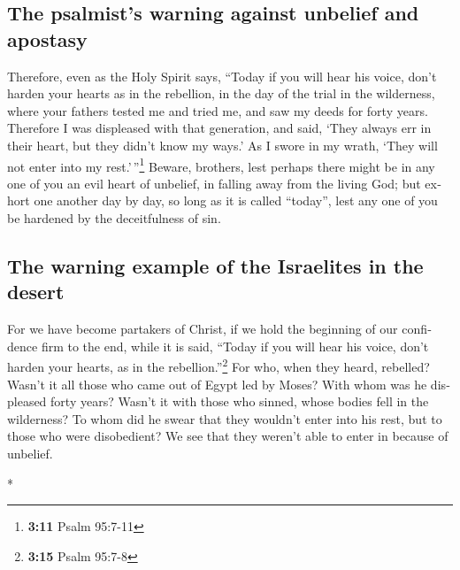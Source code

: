 \begin{paracol}{2}
\begin{otherlanguage}{english}
\hypertarget{the-psalmists-warning-against-unbelief-and-apostasy}{%
\subsection{The psalmist's warning against unbelief and
apostasy}\label{the-psalmists-warning-against-unbelief-and-apostasy}}

 Therefore, even as the Holy Spirit says, ``Today if you
will hear his voice,  don't harden your hearts as in the
rebellion, in the day of the trial in the wilderness, 
where your fathers tested me and tried me, and saw my deeds for forty
years.  Therefore I was displeased with that generation,
and said, `They always err in their heart, but they didn't know my
ways.'  As I swore in my wrath, `They will not enter into
my rest.'\,''\footnote{\textbf{3:11} Psalm 95:7-11} 
Beware, brothers, lest perhaps there might be in any one of you an evil
heart of unbelief, in falling away from the living God; 
but exhort one another day by day, so long as it is called ``today'',
lest any one of you be hardened by the deceitfulness of sin.

\hypertarget{the-warning-example-of-the-israelites-in-the-desert}{%
\subsection{The warning example of the Israelites in the
desert}\label{the-warning-example-of-the-israelites-in-the-desert}}

 For we have become partakers of Christ, if we hold the
beginning of our confidence firm to the end,  while it is
said, ``Today if you will hear his voice, don't harden your hearts, as
in the rebellion.''\footnote{\textbf{3:15} Psalm 95:7-8} 
For who, when they heard, rebelled? Wasn't it all those who came out of
Egypt led by Moses?  With whom was he displeased forty
years? Wasn't it with those who sinned, whose bodies fell in the
wilderness?  To whom did he swear that they wouldn't
enter into his rest, but to those who were disobedient? 
We see that they weren't able to enter in because of unbelief.

\end{otherlanguage}

\switchcolumn[0]*

\hypertarget{interpretaciuxf3n-de-la-promesa-del-salmo-sobre-el-resto-del-pueblo-de-dios}{%
}
\end{paracol}
